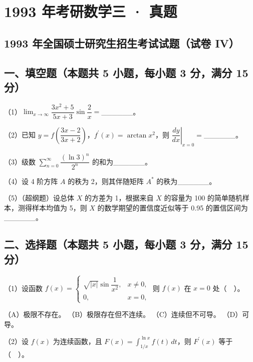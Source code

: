 \documentclass[UTF8,12pt]{ctexart}
\begin{document}
\section*{1993 年考研数学三 · 真题}
\subsection*{1993 年全国硕士研究生招生考试试题（试卷 IV）}

\subsection*{一、填空题（本题共 5 小题，每小题 3 分，满分 15 分）}

（1）\(\displaystyle \lim_{x\to\infty}\dfrac{\displaystyle 3x^2+5}{\displaystyle 5x+3}\sin\dfrac{\displaystyle 2}{\displaystyle x}=\)\_\_\_\_\_\_。


（2）已知 \(\displaystyle y=f\left(\dfrac{\displaystyle 3x-2}{\displaystyle 3x+2}\right)\)，\(\displaystyle f^{\prime}(x)=\arctan x^2\)，则 \(\displaystyle \left.\dfrac{\displaystyle dy}{\displaystyle dx}\right|_{x=0}=\)\_\_\_\_\_\_。


（3）级数 \(\displaystyle \sum_{n=0}^{\infty}\dfrac{\displaystyle (\ln3)^n}{\displaystyle 2^n}\) 的和为\_\_\_\_\_\_。


（4）设 4 阶方阵 \(\displaystyle A\) 的秩为 2，则其伴随矩阵 \(\displaystyle A^*\) 的秩为\_\_\_\_\_\_。


（5）（超纲题）设总体 \(\displaystyle X\) 的方差为 1，根据来自 \(\displaystyle X\) 的容量为 100 的简单随机样本，测得样本均值为 5，则 \(\displaystyle X\) 的数学期望的置信度近似等于 0.95 的置信区间为\_\_\_\_\_\_。


\subsection*{二、选择题（本题共 5 小题，每小题 3 分，满分 15 分）}

（1）设函数 \(\displaystyle f(x)=\begin{cases}\sqrt{|x|}\sin\dfrac{\displaystyle 1}{\displaystyle x^2},\allowbreak &x\ne0,\allowbreak \\0,\allowbreak &x=0,\allowbreak \end{cases}\) 则 \(\displaystyle f(x)\) 在 \(\displaystyle x=0\) 处（　）。


（A）极限不存在。 （B）极限存在但不连续。 （C）连续但不可导。 （D）可导。


（2）设 \(\displaystyle f(x)\) 为连续函数，且 \(\displaystyle F(x)=\displaystyle \int_{1/x}^{\ln x}f(t)\,dt\)，则 \(\displaystyle F^{\prime}(x)\) 等于（　）。
\end{document}

